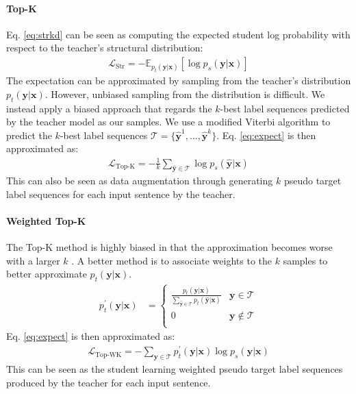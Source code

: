 \documentclass[11pt,a4paper]{article}
\newcommand{\xvec}{\mathbf{x}}
\newcommand{\yvec}{\mathbf{y}}
\newcommand{\mcL}{\mathcal{L}}
\newcommand{\mcT}{\mathcal{T}}
\begin{document}
\paragraph{Top-K}
Eq. \ref{eq:strkd} can be seen as computing the expected student log probability with respect to the teacher's structural distribution:
\begin{align}
\mcL_{\text{Str}} = -\mathbb{E}_{p_t(\yvec|\xvec)}[\log p_s(\yvec|\xvec)]\label{eq:expect}
\end{align}
The expectation can be approximated by sampling from the teacher's distribution $p_t(\yvec|\xvec)$. However, unbiased sampling from the distribution is difficult. We instead apply a biased approach that regards the $k$-best label sequences predicted by the teacher model as our samples. We use a modified Viterbi algorithm to predict the $k$-best label sequences $\mcT=\{\hat{\yvec}^1,\dots,\hat{\yvec}^k\}$. Eq. \ref{eq:expect} is then approximated as:
\begin{align}
\mcL_{\text{Top-K}} = - \frac{1}{k}\sum\limits_{\hat{\yvec}\in \mcT} \log p_s(\hat{\yvec}|\xvec) \label{eq:kbest}
\end{align}
This can also be seen as data augmentation through generating $k$ pseudo target label sequences for each input sentence by the teacher.

\paragraph{Weighted Top-K}
The Top-K method is highly biased in that the approximation becomes worse with a larger $k$ . A better method is to associate weights to the $k$ samples to better approximate $p_t(\yvec|\xvec)$.
\begin{align*}
p^{\prime}_t(\yvec|\xvec) & = 
\begin{cases}
\frac{p_t(\yvec|\xvec)}{\sum\limits_{\hat{\yvec}\in \mcT}p_t(\hat{\yvec}|\xvec)} & \yvec \in \mcT\\
0 & \yvec \notin \mcT \\
\end{cases}
\end{align*}
Eq. \ref{eq:expect} is then approximated as:
\begin{align}
\mcL_{\text{Top-WK}} = - \sum\limits_{\yvec\in \mcT} p^{\prime}_t(\yvec|\xvec) \log p_s(\yvec|\xvec) \label{eq:weighted}
\end{align}
This can be seen as the student learning weighted pseudo target label sequences produced by the teacher for each input sentence.
\end{document}
